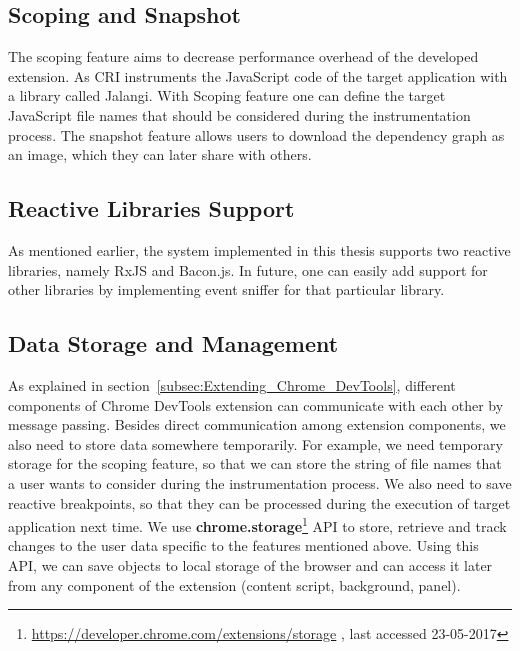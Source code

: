 \subsection{Scoping and Snapshot}
The scoping feature aims to decrease performance overhead of the developed extension. As CRI instruments the JavaScript code of the target application with a library called Jalangi. With Scoping feature one can define the target JavaScript file names that should be considered during the instrumentation process. The snapshot feature allows users to download the dependency graph as an image, which they can later share with others. 

\subsection{Reactive Libraries Support}
As mentioned earlier, the system implemented in this thesis supports two reactive libraries, namely RxJS and Bacon.js. In future, one can easily add support for other libraries by implementing event sniffer for that particular library. 

\subsection{Data Storage and Management} \label{subsec:Data_Storage_and_mgmt}
As explained in section~\ref{subsec:Extending_Chrome_DevTools}, different components of Chrome DevTools extension can communicate with each other by message passing. Besides direct communication among extension components, we also need to store data somewhere temporarily. For example, we need temporary storage for the scoping feature, so that we can store the string of file names that a user wants to consider during the instrumentation process. We also need to save reactive breakpoints, so that they can be processed during the execution of target application next time. We use \textbf{chrome.storage}\footnote{\url{https://developer.chrome.com/extensions/storage} , last accessed 23-05-2017} API to store, retrieve and track changes to the user data specific to the features mentioned above. Using this API, we can save objects to local storage of the browser and can access it later from any component of the extension (content script, background, panel).

